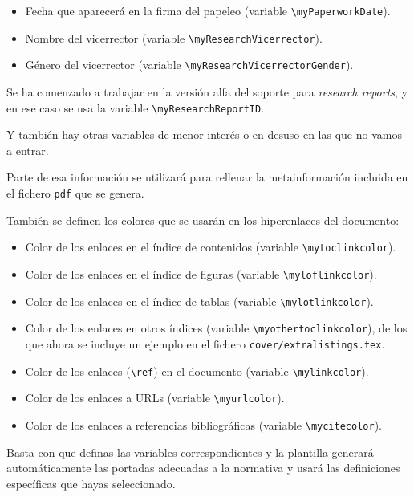 {\begin{itemize}
    \item Fecha que aparecerá en la firma del papeleo (variable \texttt{\textbackslash{}myPaperworkDate}).

    \item Nombre del vicerrector (variable \texttt{\textbackslash{}myResearchVicerrector}).
    \item Género del vicerrector (variable \texttt{\textbackslash{}myResearchVicerrectorGender}).
  \end{itemize}

  Se ha comenzado a trabajar en la versión alfa del soporte para \textit{research reports}, y en ese caso se usa la variable \texttt{\textbackslash{}myResearchReportID}.

  Y también hay otras variables de menor interés o en desuso en las que no vamos a entrar.

  Parte de esa información se utilizará para rellenar la metainformación incluida en el fichero \texttt{pdf} que se genera.


  También se definen los colores que se usarán en los hiperenlaces del documento:

  \begin{itemize}
    \item Color de los enlaces en el índice de contenidos (variable \texttt{\textbackslash{}mytoclinkcolor}).
    \item Color de los enlaces en el índice de figuras (variable \texttt{\textbackslash{}myloflinkcolor}).
    \item Color de los enlaces en el índice de tablas (variable \texttt{\textbackslash{}mylotlinkcolor}).
    \item Color de los enlaces en otros índices (variable \texttt{\textbackslash{}myothertoclinkcolor}), de los que ahora se incluye un ejemplo en el fichero \texttt{cover/extralistings.tex}.
    \item Color de los enlaces (\texttt{\textbackslash{}ref}) en el documento (variable \texttt{\textbackslash{}mylinkcolor}).
    \item Color de los enlaces a URLs (variable \texttt{\textbackslash{}myurlcolor}).
    \item Color de los enlaces a referencias bibliográficas (variable \texttt{\textbackslash{}mycitecolor}).
  \end{itemize}

  Basta con que definas las variables correspondientes y la plantilla generará automáticamente las portadas adecuadas a la normativa y usará las definiciones específicas que hayas seleccionado.

}
